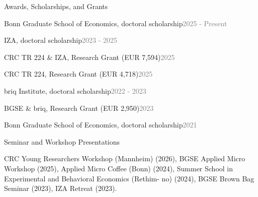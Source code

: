 \documentclass{resume} %
\newcommand{\cvaward}[2]{%
  \noindent#1\hfill\textcolor{gray}{\small #2}\par\smallskip
}
\begin{document}

\begin{rSection}{Awards, Scholarships, and Grants}

\cvaward{Bonn Graduate School of Economics, doctoral scholarship}{2025 - Present}
\cvaward{IZA, doctoral scholarship}{2023 - 2025}
\cvaward{CRC TR 224 \& IZA, Research Grant (EUR 7,594)}{2025}
\cvaward{CRC TR 224, Research Grant (EUR 4,718)}{2025}
\cvaward{briq Institute, doctoral scholarship}{2022 - 2023}
\cvaward{BGSE \& briq, Research Grant (EUR 2,950)}{2023}
\cvaward{Bonn Graduate School of Economics, doctoral scholarship}{2021}

\end{rSection}


\begin{rSection}{Seminar and Workshop Presentations}

\noindent CRC Young Researchers Workshop (Mannheim) (2026), BGSE Applied Micro Workshop (2025), Applied Micro Coffee (Bonn) (2024), Summer School in Experimental and Behavioral Economics (Rethim- no) (2024), BGSE Brown Bag Seminar (2023),  IZA Retreat (2023).


\end{rSection}

\end{document}
